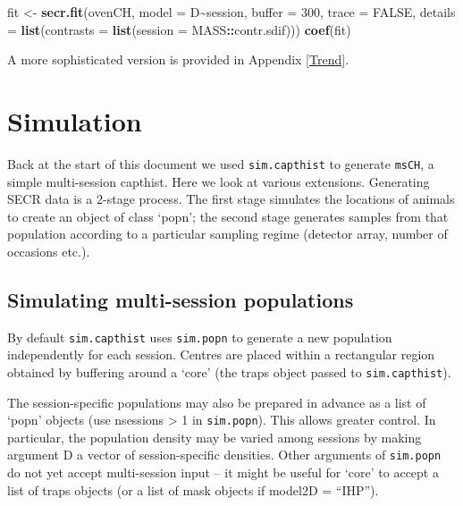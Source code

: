 \documentclass[
]{book}
\newenvironment{Shaded}{\begin{snugshade}}{\end{snugshade}}
\newcommand{\AttributeTok}[1]{\textcolor[rgb]{0.13,0.29,0.53}{#1}}
\newcommand{\ConstantTok}[1]{\textcolor[rgb]{0.56,0.35,0.01}{#1}}
\newcommand{\DecValTok}[1]{\textcolor[rgb]{0.00,0.00,0.81}{#1}}
\newcommand{\FunctionTok}[1]{\textcolor[rgb]{0.13,0.29,0.53}{\textbf{#1}}}
\newcommand{\NormalTok}[1]{#1}
\newcommand{\OtherTok}[1]{\textcolor[rgb]{0.56,0.35,0.01}{#1}}
\newcommand{\SpecialCharTok}[1]{\textcolor[rgb]{0.81,0.36,0.00}{\textbf{#1}}}
\begin{document}
\begin{Shaded}
\begin{Highlighting}[]
\NormalTok{fit }\OtherTok{\textless{}{-}} \FunctionTok{secr.fit}\NormalTok{(ovenCH, }\AttributeTok{model =}\NormalTok{ D}\SpecialCharTok{\textasciitilde{}}\NormalTok{session, }\AttributeTok{buffer =} \DecValTok{300}\NormalTok{, }\AttributeTok{trace =} \ConstantTok{FALSE}\NormalTok{,}
    \AttributeTok{details =} \FunctionTok{list}\NormalTok{(}\AttributeTok{contrasts =} \FunctionTok{list}\NormalTok{(}\AttributeTok{session =}\NormalTok{ MASS}\SpecialCharTok{::}\NormalTok{contr.sdif)))}
\FunctionTok{coef}\NormalTok{(fit)}
\end{Highlighting}
\end{Shaded}

A more sophisticated version is provided in Appendix \ref{Trend}.

\section{Simulation}\label{simulation}

Back at the start of this document we used \texttt{sim.capthist} to generate \texttt{msCH}, a simple multi-session capthist. Here we look at various extensions. Generating SECR data is a 2-stage process. The first stage simulates the locations of animals to create an object of class `popn'; the second stage generates samples from that population according to a particular sampling regime (detector array, number of occasions etc.).

\subsection{Simulating multi-session populations}\label{simulating-multi-session-populations}

By default \texttt{sim.capthist} uses \texttt{sim.popn} to generate a new population independently for each session. Centres are placed within a rectangular region obtained by buffering around a `core' (the traps object passed to \texttt{sim.capthist}).

The session-specific populations may also be prepared in advance as a list of `popn' objects (use nsessions \textgreater{} 1 in \texttt{sim.popn}). This allows greater control. In particular, the population density may be varied among sessions by making argument D a vector of session-specific densities. Other arguments of \texttt{sim.popn} do not yet accept multi-session input -- it might be useful for `core' to accept a list of traps objects (or a list of mask objects if model2D = ``IHP'').
\end{document}
